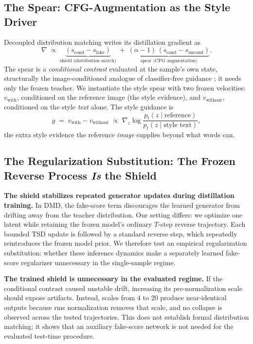 \documentclass[letterpaper]{article} %
\begin{document}
\subsection{The Spear: CFG-Augmentation as the Style Driver}

Decoupled distribution matching \citep{liu2025decoupled} writes its
distillation gradient as
\begin{equation}
\nabla \;\propto\; \underbrace{(s_{\text{cond}}-s_{\text{fake}})}_{\text{shield
(distribution match)}}\;+\;\underbrace{(\alpha-1)\,(s_{\text{cond}}-s_{\text{uncond}})}_{\text{spear
(CFG augmentation)}}.
\label{eq:spearshield}
\end{equation}
The spear is a \emph{conditional contrast} evaluated at the sample's own
state, structurally the image-conditioned analogue of classifier-free
guidance \citep{ho2022cfg}; it needs only the frozen teacher. We instantiate
the style spear with two frozen velocities: $v_{\text{with}}$, conditioned on
the reference image (the style evidence), and $v_{\text{without}}$,
conditioned on the style \emph{text} alone. The style guidance is
\begin{equation}
g \;=\; v_{\text{with}} - v_{\text{without}} \;\propto\; \nabla_z \log
\frac{p_t(z\mid \text{reference})}{p_t(z\mid \text{style text})},
\label{eq:stylespear}
\end{equation}
the extra style evidence the reference \emph{image} supplies beyond what
words can.

\subsection{The Regularization Substitution: The Frozen Reverse Process
\emph{Is} the Shield}

\textbf{The shield stabilizes repeated generator updates during distillation
training.} In DMD, the fake-score term discourages the learned generator from
drifting away from the teacher distribution. Our setting differs: we optimize
one latent while retaining the frozen model's ordinary $T$-step reverse
trajectory. Each bounded TSD update is followed by a standard reverse step,
which repeatedly reintroduces the frozen model prior. We therefore test an
empirical regularization substitution: whether these inference dynamics make a
separately learned fake-score regularizer unnecessary in the single-sample
regime.

\textbf{The trained shield is unnecessary in the evaluated regime.} If the
conditional contrast caused unstable drift, increasing its pre-normalization
scale should expose artifacts. Instead, scales from 4 to 20 produce
near-identical outputs because rms normalization removes that scale, and no
collapse is observed across the tested trajectories. This does not establish
formal distribution matching; it shows that an auxiliary fake-score network
is not needed for the evaluated test-time procedure.
\end{document}
